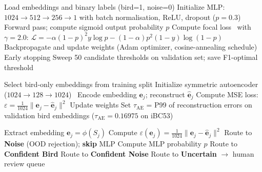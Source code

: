 \documentclass[a4paper,12pt]{article}
\begin{document}
\vspace{0.4cm}

\begin{algorithm}[H]
\caption{Focal-Loss MLP Classifier Training}
\begin{algorithmic}[1]
\STATE Load embeddings and binary labels (bird=1, noise=0)
\STATE Initialize MLP: $1024 \to 512 \to 256 \to 1$ with batch normalisation, ReLU, dropout ($p=0.3$)
    \STATE Forward pass; compute sigmoid output probability $p$
    \STATE Compute focal loss~\cite{FocalLoss} with $\gamma=2.0$:
           $\mathcal{L} = -\alpha(1-p)^{2}y\log p
           - (1-\alpha)p^{2}(1-y)\log(1-p)$
    \STATE Backpropagate and update weights (Adam optimizer, cosine-annealing schedule)
        \STATE Early stopping
    \ENDIF
\ENDFOR
\STATE Sweep 50 candidate thresholds on validation set; save F1-optimal threshold
\end{algorithmic}
\end{algorithm}

\vspace{0.4cm}

\begin{algorithm}[H]
\caption{Autoencoder OOD Gate Training (P99 Threshold)}
\begin{algorithmic}[1]
\STATE Select bird-only embeddings from training split
\STATE Initialize symmetric autoencoder ($1024 \to 128 \to 1024$)~\cite{Hinton}
    \STATE Encode embedding $\mathbf{e}_j$; reconstruct $\hat{\mathbf{e}}_j$
    \STATE Compute MSE loss: $\varepsilon = \frac{1}{1024}\|\mathbf{e}_j - \hat{\mathbf{e}}_j\|^2$
    \STATE Update weights
\ENDFOR
\STATE Set $\tau_{\mathrm{AE}}$ = P99 of reconstruction errors on validation bird embeddings
       ($\tau_{\mathrm{AE}} = 0.16975$ on iBC53)
\end{algorithmic}
\end{algorithm}

\vspace{0.4cm}

\begin{algorithm}[H]
\caption{Inference with Three-Band Routing and OOD Gate}
\begin{algorithmic}[1]
    \STATE Extract embedding $\mathbf{e}_j = \phi(S_j)$
        \STATE Compute $\varepsilon(\mathbf{e}_j) = \frac{1}{1024}\|\mathbf{e}_j - \hat{\mathbf{e}}_j\|^2$
            \STATE Route to \textbf{Noise} (OOD rejection); \textbf{skip} MLP
        \ENDIF
    \ENDIF
    \STATE Compute MLP probability $p$
        \STATE Route to \textbf{Confident Bird}
        \STATE Route to \textbf{Confident Noise}
    \ELSE
        \STATE Route to \textbf{Uncertain} $\rightarrow$ human review queue
    \ENDIF
\ENDFOR
\end{algorithmic}
\end{algorithm}
\end{document}
